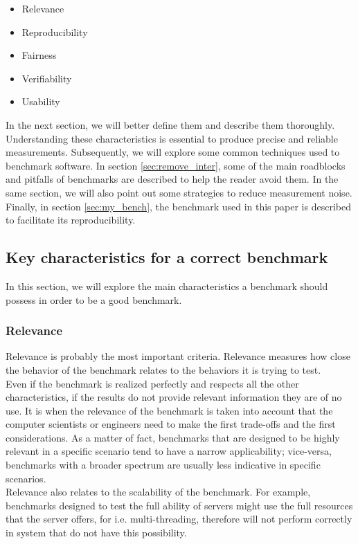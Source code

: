 \begin{itemize}
    \item Relevance
    \item Reproducibility
    \item Fairness
    \item Verifiability
    \item Usability
\end{itemize}
In the next section, we will better define them and describe them thoroughly. Understanding these characteristics is essential to produce precise and reliable measurements. Subsequently, we will explore some common techniques used to benchmark software. In section \ref{sec:remove_inter}, some of the main roadblocks and pitfalls of benchmarks are described to help the reader avoid them. In the same section, we will also point out some strategies to reduce measurement noise. Finally, in section \ref{sec:my_bench}, the benchmark used in this paper is described to facilitate its reproducibility. \\









\subsection{Key characteristics for a correct benchmark}\label{key_char}
In this section, we will explore the main characteristics a benchmark should possess in order to be a good benchmark.
\subsubsection{Relevance}
Relevance is probably the most important criteria. Relevance measures how close the behavior of the benchmark relates to the behaviors it is trying to test. \cite{how_to_bench}\\
Even if the benchmark is realized perfectly and respects all the other characteristics, if the results do not provide relevant information they are of no use. It is when the relevance of the benchmark is taken into account that the computer scientists or engineers need to make the first trade-offs and the first considerations. As a matter of fact, benchmarks that are designed to be highly relevant in a specific scenario tend to have a narrow applicability; vice-versa, benchmarks with a broader spectrum are usually less indicative in specific scenarios. \cite{how_to_bench}\\
Relevance also relates to the scalability of the benchmark. For example, benchmarks designed to test the full ability of servers might use the full resources that the server offers, for i.e. multi-threading, therefore will not perform correctly in system that do not have this possibility. \cite{how_to_bench}

